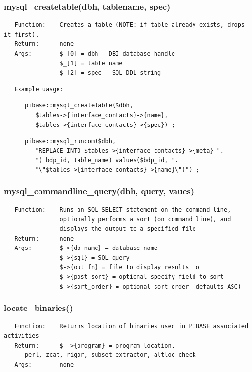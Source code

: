 \documentclass{article}
\begin{document}
\subsubsection*{mysql\_createtable(dbh, tablename, spec)\label{pibase_pm_mysql_createtable_dbh_tablename_spec_}}
\begin{verbatim}
   Function:    Creates a table (NOTE: if table already exists, drops it first).
   Return:      none
   Args:        $_[0] = dbh - DBI database handle
                $_[1] = table name
                $_[2] = spec - SQL DDL string
\end{verbatim}
\begin{verbatim}
   Example uasge:
\end{verbatim}
\begin{verbatim}
      pibase::mysql_createtable($dbh,
         $tables->{interface_contacts}->{name},
         $tables->{interface_contacts}->{spec}) ;
\end{verbatim}
\begin{verbatim}
      pibase::mysql_runcom($dbh,
         "REPLACE INTO $tables->{interface_contacts}->{meta} ".
         "( bdp_id, table_name) values($bdp_id, ".
         "\"$tables->{interface_contacts}->{name}\")") ;
\end{verbatim}
\subsubsection*{mysql\_commandline\_query(dbh, query, vaues)\label{pibase_pm_mysql_commandline_query_dbh_query_vaues_}}
\begin{verbatim}
   Function:    Runs an SQL SELECT statement on the command line,
                optionally performs a sort (on command line), and 
                displays the output to a specified file
   Return:      none
   Args:        $->{db_name} = database name
                $->{sql} = SQL query
                $->{out_fn} = file to display results to
                $->{post_sort} = optional specify field to sort
                $->{sort_order} = optional sort order (defaults ASC)
\end{verbatim}
\subsubsection*{locate\_binaries()\label{pibase_pm_locate_binaries_}}
\begin{verbatim}
   Function:    Returns location of binaries used in PIBASE associated activities
   Return:      $_->{program} = program location.
      perl, zcat, rigor, subset_extractor, altloc_check
   Args:        none
\end{verbatim}
\end{document}
